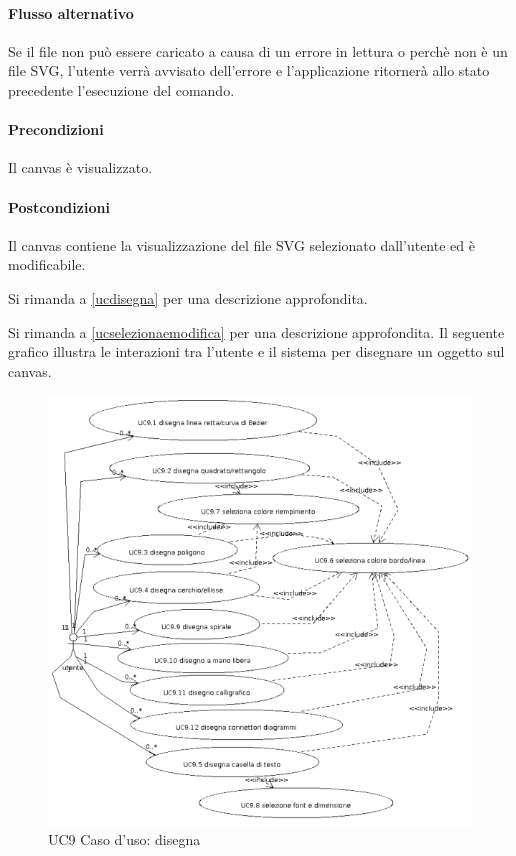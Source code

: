 \paragraph{Flusso alternativo}
Se il file non pu\`o essere caricato a causa di un errore in lettura o perch\`e non \`e un file SVG, l'utente verr\`a avvisato dell'errore e l'applicazione ritorner\`a allo stato precedente l'esecuzione del comando.
\paragraph{Precondizioni} Il canvas \`e visualizzato.
\paragraph{Postcondizioni} Il canvas contiene la visualizzazione del file SVG selezionato dall'utente ed \`e modificabile.

Si rimanda a \ref{ucdisegna} per una descrizione approfondita.

Si rimanda a \ref{ucselezionaemodifica} per una descrizione approfondita.
\newpage
{}
\label{ucdisegna}
Il seguente grafico illustra le interazioni tra l'utente e il sistema per disegnare un oggetto sul canvas.

\begin{figure}[!ht]
\centering
\vspace{20pt} 
\includegraphics{UC9Espanso}
\caption{UC9 Caso d'uso: disegna}
\label{uc9}
\end{figure}


